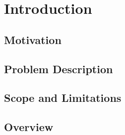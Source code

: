 \chapter{Introduction}
\label{ch:introduction}

% 

\section{Motivation}
\label{sec:motivation}


\section{Problem Description}
\label{sec:problem-description}

% 

\section{Scope and Limitations}
\label{sec:scope-limitations}

% 

\section{Overview}
\label{sec:introduction-overview}

% 

